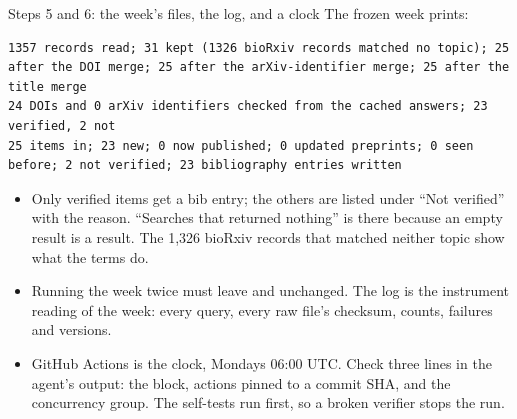 \documentclass[11pt,aspectratio=169]{beamer}
\begin{document}
\begin{frame}[fragile]{Steps 5 and 6: the week's files, the log, and a clock}
  \small The frozen week prints:
  \begin{lstlisting}[basicstyle=\ttfamily\scriptsize]
1357 records read; 31 kept (1326 bioRxiv records matched no topic); 25 after the DOI merge; 25 after the arXiv-identifier merge; 25 after the title merge
24 DOIs and 0 arXiv identifiers checked from the cached answers; 23 verified, 2 not
25 items in; 23 new; 0 now published; 0 updated preprints; 0 seen before; 2 not verified; 23 bibliography entries written
  \end{lstlisting}
  \small
  \begin{itemize}
    \item Only verified items get a bib entry; the others are listed under ``Not verified'' with the reason. ``Searches that returned nothing'' is there because an empty result is a result. The 1,326 bioRxiv records that matched neither topic show what the terms do.
    \item Running the week twice must leave  and  unchanged. The log is the instrument reading of the week: every query, every raw file's checksum, counts, failures and versions.
    \item GitHub Actions is the clock, Mondays 06:00 UTC. Check three lines in the agent's output: the  block, actions pinned to a commit SHA, and the concurrency group. The self-tests run first, so a broken verifier stops the run.
  \end{itemize}
\end{frame}
\end{document}
